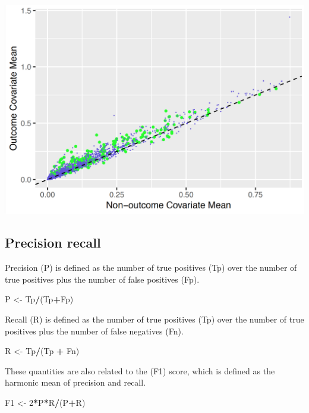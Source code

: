 \documentclass[]{book}
\newenvironment{Shaded}{\begin{snugshade}}{\end{snugshade}}
\newcommand{\DecValTok}[1]{\textcolor[rgb]{0.00,0.00,0.81}{#1}}
\newcommand{\StringTok}[1]{\textcolor[rgb]{0.31,0.60,0.02}{#1}}
\newcommand{\OperatorTok}[1]{\textcolor[rgb]{0.81,0.36,0.00}{\textbf{#1}}}
\newcommand{\NormalTok}[1]{#1}
\begin{document}
\includegraphics[width=1\linewidth]{images/PatientLevelPrediction/variableScatterplot}

\newpage

\subsection{Precision recall}\label{precision-recall}

Precision (P) is defined as the number of true positives (Tp) over the
number of true positives plus the number of false positives (Fp).

\begin{Shaded}
\begin{Highlighting}[]
\NormalTok{P <-}\StringTok{ }\NormalTok{Tp}\OperatorTok{/}\NormalTok{(Tp}\OperatorTok{+}\NormalTok{Fp)}
\end{Highlighting}
\end{Shaded}

Recall (R) is defined as the number of true positives (Tp) over the
number of true positives plus the number of false negatives (Fn).

\begin{Shaded}
\begin{Highlighting}[]
\NormalTok{R <-}\StringTok{ }\NormalTok{Tp}\OperatorTok{/}\NormalTok{(Tp }\OperatorTok{+}\StringTok{ }\NormalTok{Fn)}
\end{Highlighting}
\end{Shaded}

These quantities are also related to the (F1) score, which is defined as
the harmonic mean of precision and recall.

\begin{Shaded}
\begin{Highlighting}[]
\NormalTok{F1 <-}\StringTok{ }\DecValTok{2}\OperatorTok{*}\NormalTok{P}\OperatorTok{*}\NormalTok{R}\OperatorTok{/}\NormalTok{(P}\OperatorTok{+}\NormalTok{R)}
\end{Highlighting}
\end{Shaded}
\end{document}
